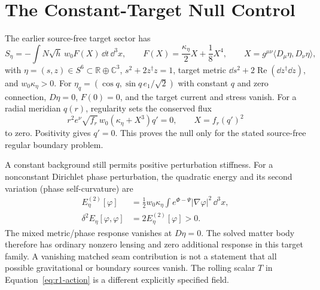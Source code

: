 \section{The Constant-Target Null Control}
\label{app:target}
The earlier source-free target sector has
\begin{equation}
 S_\eta=-\int N\sqrt h\,w_0 F(X)\,\dd t\,\dd^3x,\qquad
 F(X)=\frac{\kappa_\eta}{2}X+\frac18X^4,\qquad
 X=g^{\mu\nu}\langle D_\mu\eta,D_\nu\eta\rangle ,
\end{equation}
with $\eta=(s,z)\in S^6\subset\mathbb R\oplus\mathbb C^3$,
$s^2+2z^\dagger z=1$, target metric
$\dd s^2+2\operatorname{Re}(\dd z^\dagger\dd z)$, and
$w_0\kappa_\eta>0$. For
$\eta_q=(\cos q,\sin q\,e_1/\sqrt2)$ with constant $q$ and zero
connection, $D\eta=0$, $F(0)=0$, and the target current and stress vanish.
For a radial meridian $q(r)$, regularity sets the conserved flux
\begin{equation}
 r^2e^\nu\sqrt{f_r}\,w_0(\kappa_\eta+X^3)q'=0,
 \qquad X=f_r(q')^2
\end{equation}
to zero. Positivity gives $q'=0$. This proves the null only for the stated
source-free regular boundary problem.

A constant background still permits positive perturbation stiffness.
For a nonconstant Dirichlet phase perturbation, the quadratic energy
and its second variation (phase self-curvature) are
\[
 \begin{aligned}
 E_\eta^{(2)}[\varphi]&=\tfrac12w_0\kappa_\eta
   \int e^{\Phi-\Psi}|\nabla\varphi|^2\,\dd^3x,\\
 \delta^2E_\eta[\varphi,\varphi]&=2E_\eta^{(2)}[\varphi]>0.
 \end{aligned}
\]
The mixed metric/phase response vanishes at $D\eta=0$.
The solved matter body therefore has ordinary nonzero lensing and zero
additional response in this target family. A vanishing matched seam
contribution is not a statement that all possible gravitational or
boundary sources vanish. The rolling scalar $T$ in
Equation~\eqref{eq:r1-action} is a different explicitly specified field.

